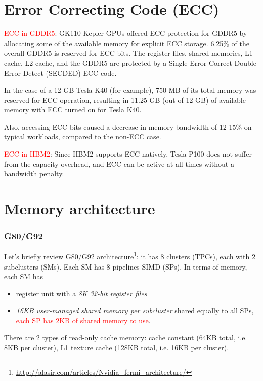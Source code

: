 \section{Error Correcting Code (ECC)}
\label{sec:ECC}


\textcolor{red}{ECC in GDDR5}:
GK110 Kepler GPUs offered ECC protection for GDDR5 by allocating some of the
available memory for explicit ECC storage. 6.25\% of the overall GDDR5 is
reserved for ECC bits.
The register files, shared memories, L1 cache, L2 cache, and the GDDR5 are
protected by a Single‐Error Correct Double‐Error Detect (SECDED) ECC code.


In the case of a 12 GB Tesla K40 (for example), 750 MB of its total memory was
reserved for ECC operation, resulting in 11.25 GB (out of 12 GB) of available
memory with ECC turned on for Tesla K40.

Also, accessing ECC bits caused a decrease in memory bandwidth of 12-15\% on
typical workloads, compared to the non-ECC case.

\textcolor{red}{ECC in HBM2}:
Since HBM2 supports ECC natively, Tesla P100 does not suffer from the capacity
overhead, and ECC can be active at all times without a bandwidth penalty.





\section{Memory architecture}
\label{sec:close-view-at}

\subsubsection{G80/G92}
\label{sec:g80g92_memory}

Let's briefly review G80/G92
architecture\footnote{\url{http://alasir.com/articles/Nvidia_fermi_architecture/}}:
it has 8 clusters (TPCs), each with 2 subclusters (SMs). Each SM has 8
pipelines SIMD (SPs).  In terms of memory, each SM has
\begin{itemize}
\item register unit with a {\it 8K 32-bit register files}
\item {\it 16KB user-managed shared memory per subcluster} shared
  equally to all SPs,
  \textcolor{red}{each SP has 2KB of shared memory to use}.
\end{itemize}
There are 2 types of read-only cache memory: cache constant (64KB
total, i.e. 8KB per cluster), L1 texture cache (128KB total, i.e. 16KB
per cluster).

